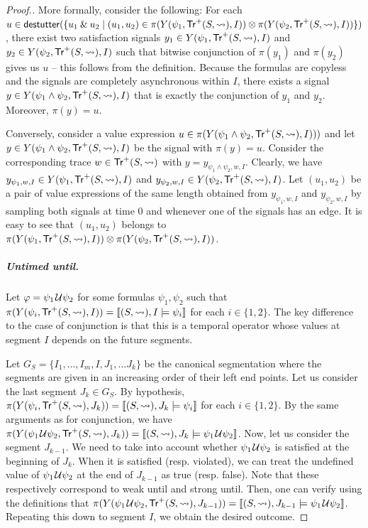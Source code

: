 \begin{proof}[\normalsize Proof.]
	More formally, consider the following:
	For each $u \in \destutter(\{ u_1 \BitAnd u_2 \st (u_1,u_2) \in \pi(Y(\psi_1, \tr^+(S,{\hb}), I)) \otimes \pi(Y(\psi_2, \tr^+(S,{\hb}), I))\})$, there exist two satisfaction signals $y_1 \in Y(\psi_1, \mathsf{Tr}^+(S,{\rightsquigarrow}), I)$ and $y_2 \in Y(\psi_2, \mathsf{Tr}^+(S,{\rightsquigarrow}), I)$ such that bitwise conjunction of $\pi(y_1)$ and $\pi(y_2)$ gives us $u$ -- this follows from the definition.
	Because the formulas are copyless and the signals are completely asynchronous within $I$, there exists a signal $y \in Y(\psi_1 \land \psi_2, \mathsf{Tr}^+(S,{\rightsquigarrow}), I)$ that is exactly the conjunction of $y_1$ and $y_2$.
	Moreover, $\pi(y) = u$.
	
	Conversely, consider a value expression $u \in \pi(Y(\psi_1 \land \psi_2, \mathsf{Tr}^+(S,{\rightsquigarrow}), I)))$ and let $y \in Y(\psi_1 \land \psi_2, \mathsf{Tr}^+(S,{\rightsquigarrow}), I)$ be the signal with $\pi(y) = u$.
	Consider the corresponding trace $w \in \mathsf{Tr}^+(S,{\rightsquigarrow})$ with $y = y_{\psi_1 \land \psi_2, w, I}$.
	Clearly, we have $y_{\psi_1, w, I} \in Y(\psi_1, \mathsf{Tr}^+(S,{\rightsquigarrow}), I)$ and $y_{\psi_2, w, I} \in Y(\psi_2, \mathsf{Tr}^+(S,{\rightsquigarrow}), I)$.
	Let $(u_1,u_2)$ be a pair of value expressions of the same length obtained from $y_{\psi_1, w, I}$ and $y_{\psi_2, w, I}$ by sampling both signals at time 0 and whenever one of the signals has an edge.
	It is easy to see that $(u_1,u_2)$ belongs to $\pi(Y(\psi_1, \mathsf{Tr}^+(S,{\rightsquigarrow}), I)) \otimes \pi(Y(\psi_2, \mathsf{Tr}^+(S,{\rightsquigarrow}), I))$.
	
	\subparagraph*{Untimed until.}
	Let $\varphi = \psi_1 \kern.1em\mathcal{U} \psi_2$ for some formulas $\psi_1, \psi_2$ such that $\pi(Y(\psi_i, \mathsf{Tr}^+(S,{\rightsquigarrow}), I)) = \llbracket (S,{\rightsquigarrow}), I \models \psi_i \rrbracket$ for each $i \in \{1,2\}$.
	The key difference to the case of conjunction is that this is a temporal operator whose values at segment $I$ depends on the future segments.
	
	Let $G_S = \{ I_1, \ldots, I_m, I, J_1, \ldots J_k \}$ be the canonical segmentation where the segments are given in an increasing order of their left end points.
	Let us consider the last segment $J_k \in G_S$.
	By hypothesis, $\pi(Y(\psi_i, \mathsf{Tr}^+(S,{\rightsquigarrow}), J_k)) = \llbracket (S,{\rightsquigarrow}), J_k \models \psi_i \rrbracket$ for each $i \in \{1,2\}$.
	By the same arguments as for conjunction, we have $\pi(Y(\psi_1 \kern.1em\mathcal{U} \psi_2, \mathsf{Tr}^+(S,{\rightsquigarrow}), J_k)) = \llbracket (S,{\rightsquigarrow}), J_k \models \psi_1 \kern.1em\mathcal{U} \psi_2 \rrbracket$.
	Now, let us consider the segment $J_{k-1}$.
	We need to take into account whether $\psi_1 \kern.1em\mathcal{U} \psi_2$ is satisfied at the beginning of $J_k$.
	When it is satisfied (resp. violated), we can treat the undefined value of $\psi_1 \kern.1em\mathcal{U} \psi_2$ at the end of $J_{k-1}$ as true (resp. false).
	Note that these respectively correspond to weak until and strong until.
	Then, one can verify using the definitions that $\pi(Y(\psi_1 \kern.1em\mathcal{U} \psi_2, \mathsf{Tr}^+(S,{\rightsquigarrow}), J_{k-1})) = \llbracket (S,{\rightsquigarrow}), J_{k-1} \models \psi_1 \kern.1em\mathcal{U} \psi_2 \rrbracket$.
	Repeating this down to segment $I$, we obtain the desired outcome.
	

\end{proof}
